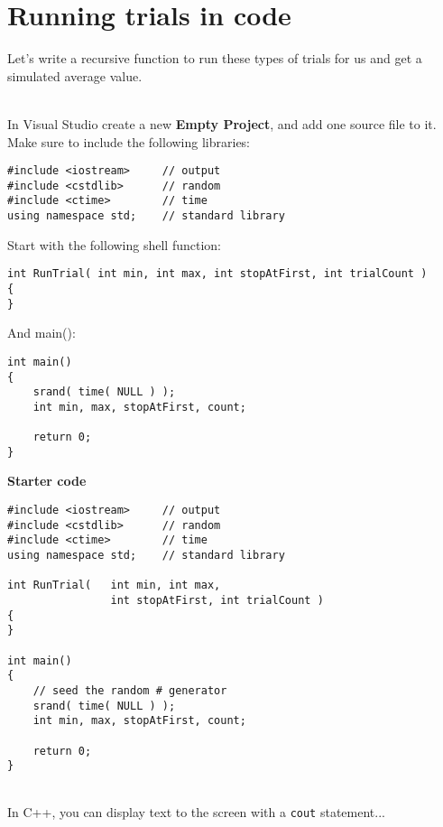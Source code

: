 \documentclass[a4paper,12pt]{book}
\title{}
\author{Rachel Morris}
\date{\today}
\begin{document}
    \togglefalse{answerkey}
    
    \section*{Running trials in code}

        Let's write a recursive function to run these types of trials
        for us and get a simulated average value.

        ~\\
        In Visual Studio create a new \textbf{Empty Project}, and add
        one source file to it. Make sure to include the following libraries:

\begin{verbatim}
#include <iostream>     // output
#include <cstdlib>      // random
#include <ctime>        // time
using namespace std;    // standard library
\end{verbatim}

        Start with the following shell function:
        
\begin{verbatim}
int RunTrial( int min, int max, int stopAtFirst, int trialCount )
{
}
\end{verbatim}

        And main():

\begin{verbatim}
int main()
{
    srand( time( NULL ) );
    int min, max, stopAtFirst, count;
    
    return 0;
}
\end{verbatim}

\newpage

\textbf{Starter code}

\begin{lstlisting}[style=code]
#include <iostream>     // output
#include <cstdlib>      // random
#include <ctime>        // time
using namespace std;    // standard library

int RunTrial(   int min, int max,
                int stopAtFirst, int trialCount )
{
}

int main()
{
    // seed the random # generator
    srand( time( NULL ) );  
    int min, max, stopAtFirst, count;
    
    return 0;
}
\end{lstlisting}
    ~\\
    
    In C++, you can display text to the screen with a \texttt{cout} statement...
\end{document}
